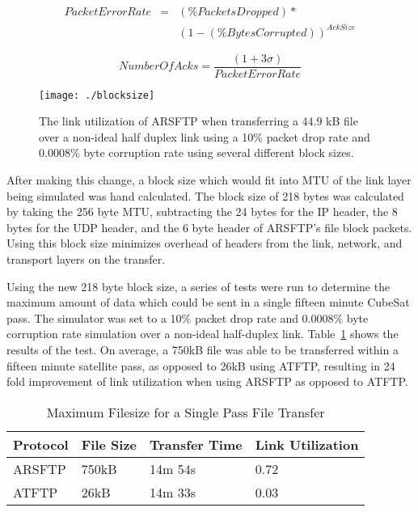 \documentclass[journal]{./IEEEtran}
\begin{document}
\begin{eqnarray}
\label{eq_packet_error}
Packet Error Rate &=& \left(\% Packets Dropped\right) * \\
&& \left(1-\left(\% Bytes Corrupted\right)\right)^{Ack Size} \nonumber
\end{eqnarray}

\begin{equation}
\label{eq_num_acks}
Number Of Acks = \frac{\left(1+3\sigma\right)}{Packet Error Rate}
\end{equation}

\begin{figure}[h!]
\begin{center}
\texttt{[image: ./blocksize]}
\end{center}
\caption{The link utilization of ARSFTP when transferring a 44.9 kB file over a non-ideal half duplex link using a 10\% packet drop rate and 0.0008\% byte corruption rate using several different block sizes.}
\label{fig_blocksize}
\end{figure}

After making this change, a block size which would fit into MTU of the link layer being simulated was hand calculated. The block size of 218 bytes was calculated by taking the 256 byte MTU, subtracting the 24 bytes for the IP header, the 8 bytes for the UDP header, and the 6 byte header of ARSFTP's file block packets. Using this block size minimizes overhead of headers from the link, network, and transport layers on the transfer.  

Using the new 218 byte block size, a series of tests were run to determine the maximum amount of data which could be sent in a single fifteen minute CubeSat pass.  The simulator was set to a 10\% packet drop rate and 0.0008\% byte corruption rate simulation over a non-ideal half-duplex link.  Table~\ref{table_pass_data} shows the results of the test.  On average, a 750kB file was able to be transferred within a fifteen minute satellite pass, as opposed to 26kB using ATFTP, resulting in 24 fold improvement of link utilization when using ARSFTP as opposed to ATFTP.

\begin{table}[h!]
\caption{Maximum Filesize for a Single Pass File Transfer}
\label{table_pass_data}
\begin{center}
\begin{tabular}{|l|l|l|l|} \hline
\textbf{Protocol} & \textbf{File Size} & \textbf{Transfer Time} & \textbf{Link Utilization} \\ \hline
ARSFTP & 750kB & 14m 54s & 0.72 \\ \hline
ATFTP & 26kB & 14m 33s & 0.03 \\ \hline
\end{tabular}
\end{center}
\end{table}
\end{document}
